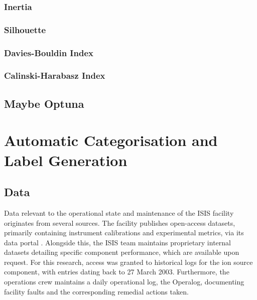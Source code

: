 \documentclass[10pt,oneside]{report}
\begin{document}
\subsection{Inertia}
\subsection{Silhouette}
\subsection{Davies-Bouldin Index}
\subsection{Calinski-Harabasz Index}

\section{Maybe Optuna}

\chapter{Automatic Categorisation and Label Generation}\label{chap:Methodology}

\section{Data}

Data relevant to the operational state and maintenance of the ISIS facility originates from several sources. The facility publishes open-access datasets, primarily containing instrument calibrations and experimental metrics, via its data portal \citep{isisdata}. Alongside this, the ISIS team maintains proprietary internal datasets detailing specific component performance, which are available upon request. For this research, access was granted to historical logs for the ion source component, with entries dating back to 27 March 2003. Furthermore, the operations crew maintains a daily operational log, the Operalog, documenting facility faults and the corresponding remedial actions taken.
\end{document}
